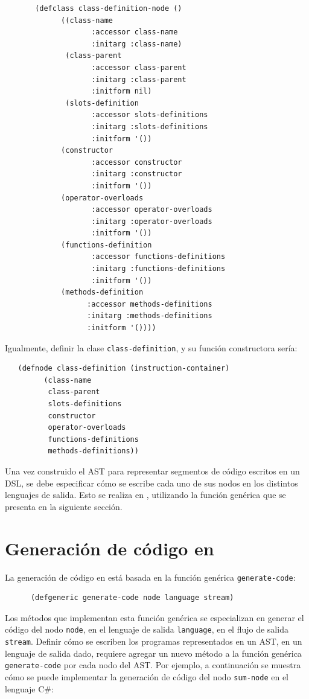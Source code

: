 \begin{verbatim}
       (defclass class-definition-node ()
             ((class-name 
                    :accessor class-name 
                    :initarg :class-name)
              (class-parent 
                    :accessor class-parent
                    :initarg :class-parent
                    :initform nil)
              (slots-definition 
                    :accessor slots-definitions 
                    :initarg :slots-definitions
                    :initform '())
             (constructor 
                    :accessor constructor 
                    :initarg :constructor
                    :initform '())
             (operator-overloads 
                    :accessor operator-overloads 
                    :initarg :operator-overloads
                    :initform '())
             (functions-definition 
                    :accessor functions-definitions 
                    :initarg :functions-definitions
                    :initform '())
             (methods-definition 
                   :accessor methods-definitions
                   :initarg :methods-definitions
                   :initform '())))
\end{verbatim}

Igualmente, definir la clase \texttt{class-definition}, y su función constructora sería:
\begin{verbatim}
   (defnode class-definition (instruction-container) 
         (class-name 
          class-parent 
          slots-definitions 
          constructor 
          operator-overloads 
          functions-definitions 
          methods-definitions))
\end{verbatim}

Una vez construido el AST para representar segmentos de código escritos en un DSL, se debe especificar cómo se escribe cada uno de sus nodos en los distintos lenguajes de salida. Esto se realiza en \gagm, utilizando la función genérica que se presenta en la siguiente sección.

\section{Generación de código en \gagm}

La generación de código en {\gagm} está basada en la función genérica \texttt{generate-code}: 
\begin{verbatim}
      (defgeneric generate-code node language stream)
\end{verbatim}
Los métodos que implementan esta función genérica se especializan en generar el código del nodo \texttt{node}, en el lenguaje de salida \texttt{language}, en el flujo de salida \texttt{stream}. Definir cómo se escriben los programas representados en un AST, en un lenguaje de salida dado, requiere agregar un nuevo método a la función genérica \texttt{generate-code} por cada nodo del AST. Por ejemplo, a continuación se muestra cómo se puede implementar la generación de código del nodo \texttt{sum-node} en el lenguaje C\#:


